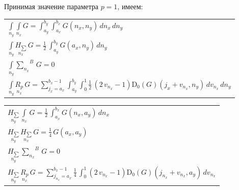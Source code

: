\documentclass[11pt]{article}
\begin{document}
Принимая значение параметра \(p = 1\), имеем:

    \begin{center}
\begin{tabular}{ | l | }
\hline

$\int\limits_{n_y}^{} \int\limits_{n_x}^{} G = \int_{a_{y}}^{b_{y}} \int_{a_{x}}^{b_{x}} G\left(n_{x}, n_{y}\right)\,{d n_{x}}\,{d n_{y}}$ \\

$\int\limits_{n_y}^{} \underset{n_x}{H_{\sum}}\,G = \frac{1}{2} \, \int_{a_{y}}^{b_{y}} G\left(a_{x}, n_{y}\right)\,{d n_{y}}$ \\

$\int\limits_{n_y}^{} {\sum\limits_{n_x}^{}}^{B}\,G = 0$ \\

$\int\limits_{n_y}^{} \underset{n_x}{R_{p}}\,G = {\sum_{j_{x}=a_{x}}^{b_{x} - 1} \int_{a_{y}}^{b_{y}} \int_{0}^{1} \frac{1}{2} \, {\left(2 \, v_{n_{x}} - 1\right)} \mathrm{D}_{0}\left(G\right)\left(j_{x} + v_{n_{x}}, n_{y}\right)\,{d v_{n_{x}}}\,{d n_{y}}}$ \\

\hline

\end{tabular}
\end{center}

    \begin{center}
\begin{tabular}{ | l | }

\hline

$\underset{n_y}{H_{\sum}}\,\int\limits_{n_x}^{}\,G = \frac{1}{2} \, \int_{a_{x}}^{b_{x}} G\left(n_{x}, a_{y}\right)\,{d n_{x}}$ \\

$\underset{n_y}{H_{\sum}}\,\underset{n_x}{H_{\sum}}\,G = \frac{1}{4} \, G\left(a_{x}, a_{y}\right)$ \\

$\underset{n_y}{H_{\sum}}\,{\sum\limits_{n_x}^{}}^{B}\,G = 0$ \\

$\underset{n_y}{H_{\sum}}\,\underset{n_x}{R_{p}}\,G = {\sum_{j_{n_{x}}=a_{x}}^{b_{x} - 1} \frac{1}{4} \, \int_{0}^{1} \left(2 \, v_{n_{x}} - 1 \right) \mathrm{D}_{0}\left(G\right)\left(j_{n_{x}} + v_{n_{x}}, a_{y}\right)\,{d v_{n_{x}}} }$ \\

\hline

\end{tabular}
\end{center}
\end{document}

